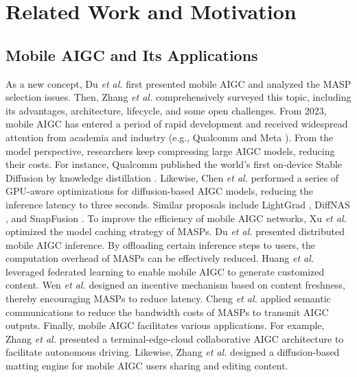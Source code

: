 \section{Related Work and Motivation}
\subsection{Mobile AIGC and Its Applications}
As a new concept, Du \textit{et al.} \cite{DuAIGC} first presented mobile AIGC and analyzed the MASP selection issues.
Then, Zhang \textit{et al.} \cite{10398474} comprehensively surveyed this topic, including its advantages, architecture, lifecycle, and some open challenges.
From 2023, mobile AIGC has entered a period of rapid development and received widespread attention from academia \cite{DuAIGC, 10233667, 10628024} and industry (e.g., Qualcomm and Meta \cite{qualcomm}).
From the model perspective, researchers keep compressing large AIGC models, reducing their costs. For instance, Qualcomm published the world's first on-device Stable Diffusion by knowledge distillation \cite{qualcomm}. Likewise, Chen \textit{et al.} \cite{chen2023speed} performed a series of GPU-aware optimizations for diffusion-based AIGC models, reducing the inference latency to three seconds. Similar proposals include LightGrad \cite{10096710}, DiffNAS \cite{li2023diffnas}, and SnapFusion \cite{li2023snapfusion}. 
To improve the efficiency of mobile AIGC networks, Xu \textit{et al.} \cite{xu2023sparks} optimized the model caching strategy of MASPs. Du \textit{et al.} \cite{10172151} presented distributed mobile AIGC inference. 
By offloading certain inference steps to users, the computation overhead of MASPs can be effectively reduced. Huang \textit{et al.} \cite{10398264} leveraged federated learning to enable mobile AIGC to generate customized content. 
Wen \textit{et al.} \cite{10233667} designed an incentive mechanism based on content freshness, thereby encouraging MASPs to reduce latency. 
Cheng \textit{et al.} \cite{AIGCSemCom} applied semantic communications to reduce the bandwidth costs of MASPs to transmit AIGC outputs.
Finally, mobile AIGC facilitates various applications. 
For example, Zhang \textit{et al.} \cite{10628024} presented a terminal-edge-cloud collaborative AIGC architecture to facilitate autonomous driving. Likewise, Zhang \textit{et al.} \cite{MATTING} designed a diffusion-based matting engine for mobile AIGC users sharing and editing content.

